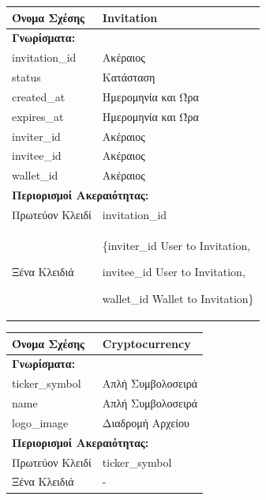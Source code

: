 \noindent
\begin{tabular}{|p{6cm}|p{6cm}|}
\hline
\textbf{Όνομα Σχέσης} & Invitation \\ \hline

\multicolumn{2}{|l|}{\textbf{Γνωρίσματα:}} \\ \hline
invitation\_id & Ακέραιος \\ \hline
status & Κατάσταση \\ \hline
created\_at & Ημερομηνία και Ώρα \\ \hline
expires\_at & Ημερομηνία και Ώρα \\ \hline
inviter\_id & Ακέραιος \\ \hline
invitee\_id & Ακέραιος \\ \hline
wallet\_id & Ακέραιος \\ \hline

\multicolumn{2}{|l|}{\textbf{Περιορισμοί Ακεραιότητας:}} \\ \hline
Πρωτεύον Κλειδί & invitation\_id \\ \hline
Ξένα Κλειδιά & \{inviter\_id User to Invitation, 

invitee\_id User to Invitation, 

wallet\_id Wallet to Invitation\} \\ \hline
\end{tabular}

\vspace{1cm}

\noindent
\begin{tabular}{|p{6cm}|p{6cm}|}
\hline
\textbf{Όνομα Σχέσης} & Cryptocurrency \\ \hline

\multicolumn{2}{|l|}{\textbf{Γνωρίσματα:}} \\ \hline
ticker\_symbol & Απλή Συμβολοσειρά \\ \hline
name & Απλή Συμβολοσειρά \\ \hline
logo\_image & Διαδρομή Αρχείου \\ \hline

\multicolumn{2}{|l|}{\textbf{Περιορισμοί Ακεραιότητας:}} \\ \hline
Πρωτεύον Κλειδί & ticker\_symbol \\ \hline
Ξένα Κλειδιά & - \\ \hline
\end{tabular}

\vspace{1cm}

